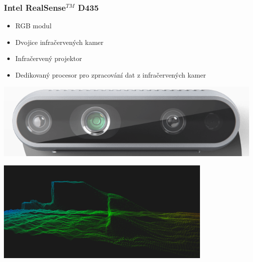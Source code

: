 \begin{frame}
    \frametitle{Intel RealSense$^{TM}$ D435}
   \begin{minipage}{.55\textwidth}
    \begin{itemize}
        \item RGB modul
        \item Dvojice infračervených kamer
        \item Infračervený projektor
        \item Dedikovaný procesor pro zpracování dat z infračervených kamer 
    \end{itemize}
    \end{minipage}
    \begin{minipage}{.43\textwidth}
      \includegraphics[width = \textwidth]{realsense_kamera.png}
    \end{minipage}
      \includegraphics[width = 0.8\textwidth]{pc_crop.png}
\end{frame}
